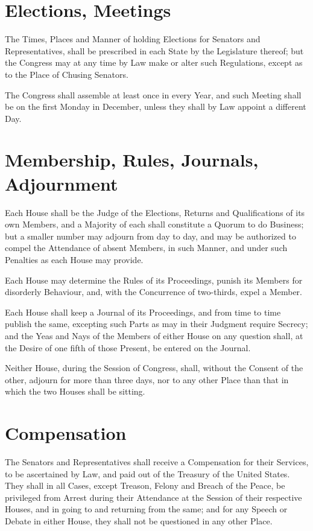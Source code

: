 \documentclass{constitution}
\begin{document}
\section{Elections, Meetings}
The Times, Places and Manner of holding Elections for Senators and Representatives, shall be prescribed in each State by the Legislature thereof;
but the Congress may at any time by Law make or alter such Regulations,
except as to the Place of Chusing Senators.

The Congress shall assemble at least once in every Year,
and such Meeting shall be on the first Monday in December,
unless they shall by Law appoint a different Day.

\section{Membership, Rules, Journals, Adjournment}
Each House shall be the Judge of the Elections, Returns and Qualifications of its own Members,
and a Majority of each shall constitute a Quorum to do Business;
but a smaller number may adjourn from day to day,
and may be authorized to compel the Attendance of absent Members, in such Manner, and under such Penalties as each House may provide.

Each House may determine the Rules of its Proceedings,
punish its Members for disorderly Behaviour,
and, with the Concurrence of two-thirds, expel a Member.

Each House shall keep a Journal of its Proceedings,
and from time to time publish the same,
excepting such Parts as may in their Judgment require Secrecy;
and the Yeas and Nays of the Members of either House on any question shall, at the Desire of one fifth of those Present, be entered on the Journal.

Neither House, during the Session of Congress, shall, without the Consent of the other, adjourn for more than three days, nor to any other Place than that in which the two Houses shall be sitting.

\section{Compensation}
The Senators and Representatives shall receive a Compensation for their Services, to be ascertained by Law, and paid out of the Treasury of the United States.
They shall in all Cases, except Treason, Felony and Breach of the Peace, be privileged from Arrest during their Attendance at the Session of their respective Houses, and in going to and returning from the same;
and for any Speech or Debate in either House, they shall not be questioned in any other Place.
\end{document}
